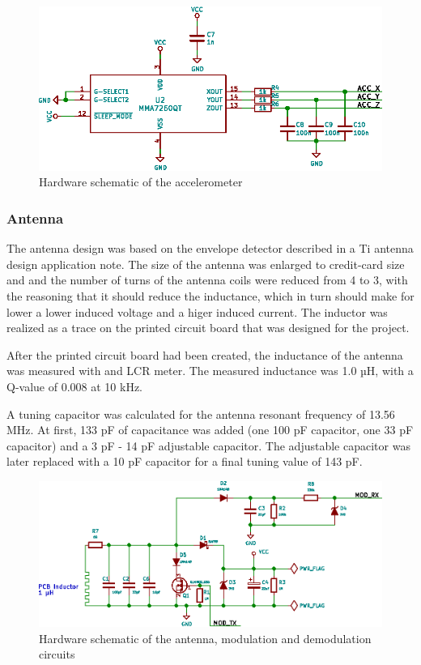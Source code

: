\begin{figure}[h!]
    \centering
    \includegraphics[scale=1.0]{res/schematic-acc.eps}
    \caption{Hardware schematic of the accelerometer}
    \label{fig:sch-acc}
\end{figure}

\subsubsection{Antenna}
The antenna design was based on the envelope detector described in a Ti antenna design application note\cite{ti-antenna}.
The size of the antenna was enlarged to credit-card size and and the number of turns of the antenna coils were reduced from 4 to 3, with the reasoning that it should reduce the inductance, which in turn should make for lower a lower induced voltage and a higer induced current.
The inductor was realized as a trace on the printed circuit board that was designed for the project.

After the printed circuit board had been created, the inductance of the antenna was measured with and LCR meter.
The measured inductance was 1.0 µH, with a Q-value of 0.008 at 10 kHz.

A tuning capacitor was calculated for the antenna resonant frequency of 13.56 MHz.
At first, 133 pF of capacitance was added (one 100 pF capacitor, one 33 pF capacitor) and a 3 pF - 14 pF adjustable capacitor. The
adjustable capacitor was later replaced with a 10 pF capacitor for a final tuning value of 143 pF.

\begin{figure}[h!]
    \centering
    \includegraphics[scale=1.0]{res/schematic-antenna.eps}
    \caption{Hardware schematic of the antenna, modulation and demodulation circuits}
    \label{fig:sch-antenna}
\end{figure}

